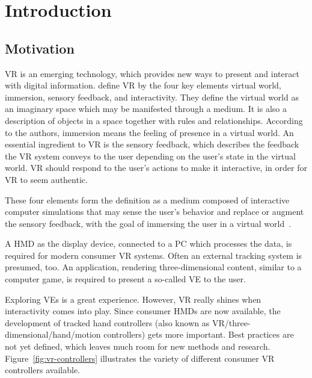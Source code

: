 \chapter{Introduction}\label{chapter:introduction}

\section{Motivation}\label{section:motivation}

\gls{VR} is an emerging technology, which provides new ways to present and interact with digital information. \citeauthor{Sherman.2003} define \gls{VR} by the four key elements virtual world, immersion, sensory feedback, and interactivity. They define the virtual world as an imaginary space which may be manifested through a medium. It is also a description of objects in a space together with rules and relationships. According to the authors, immersion means the feeling of presence in a virtual world. An essential ingredient to \gls{VR} is the sensory feedback, which describes the feedback the \gls{VR} system conveys to the user depending on the user's state in the virtual world. \gls{VR} should respond to the user's actions to make it interactive, in order for \gls{VR} to seem authentic.

These four elements form the definition as a medium composed of interactive computer simulations that may sense the user's behavior and replace or augment the sensory feedback, with the goal of immersing the user in a virtual world~\cite[6-12]{Sherman.2003}.

A \gls{HMD} as the display device, connected to a \gls{PC} which processes the data, is required for modern consumer \gls{VR} systems. Often an external tracking system is presumed, too. An application, rendering three-dimensional content, similar to a computer game, is required to present a so-called \gls{VE} to the user.

Exploring \glspl{VE} is a great experience. However, \gls{VR} really shines when interactivity comes into play. Since consumer \glspl{HMD} are now available, the development of tracked hand controllers (also known as \gls{VR}/three-dimensional/hand/motion controllers) gets more important.
Best practices are not yet defined, which leaves much room for new methods and research. Figure~\ref{fig:vr-controllers} illustrates the variety of different consumer \gls{VR} controllers available.

